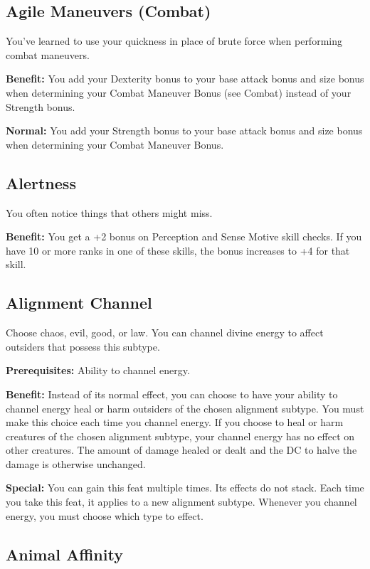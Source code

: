 \subsection{Agile Maneuvers (Combat)}

				
You've learned to use your quickness in place of brute force when performing combat maneuvers.
				
\textbf{Benefit:} You add your Dexterity bonus to your base attack bonus and size bonus when determining your Combat Maneuver Bonus (see Combat) instead of your Strength bonus.
				
\textbf{Normal:} You add your Strength bonus to your base attack bonus and size bonus when determining your Combat Maneuver Bonus.
				
\subsection{Alertness}

				
You often notice things that others might miss.
				
\textbf{Benefit:} You get a +2 bonus on Perception and Sense Motive skill checks. If you have 10 or more ranks in one of these skills, the bonus increases to +4 for that skill.
				
\subsection{Alignment Channel}

				
Choose chaos, evil, good, or law. You can channel divine energy to affect outsiders that possess this subtype.
				
\textbf{Prerequisites:} Ability to channel energy.
				
\textbf{Benefit:} Instead of its normal effect, you can choose to have your ability to channel energy heal or harm outsiders of the chosen alignment subtype. You must make this choice each time you channel energy. If you choose to heal or harm creatures of the chosen alignment subtype, your channel energy has no effect on other creatures. The amount of damage healed or dealt and the DC to halve the damage is otherwise unchanged.
				
\textbf{Special:} You can gain this feat multiple times. Its effects do not stack. Each time you take this feat, it applies to a new alignment subtype. Whenever you channel energy, you must choose which type to effect.
				
\subsection{Animal Affinity}

